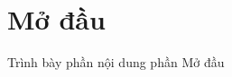 \chapter*{Mở đầu}
\label{Ch:Modau}
\mtcaddchapter[Mở đầu]
\makeatletter
\makeatother

Trình bày phần nội dung phần Mở đầu